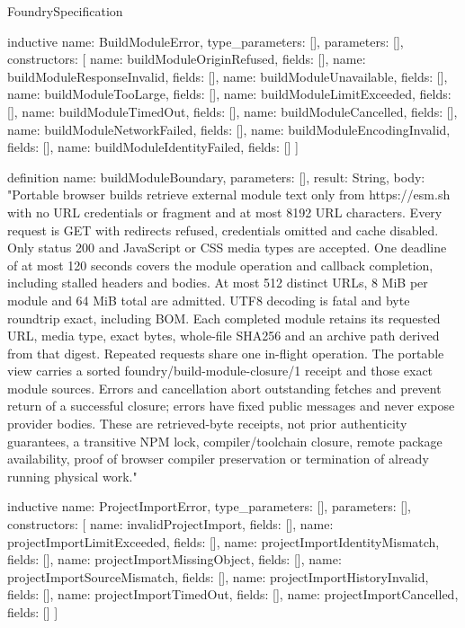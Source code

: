 \begin{lexlean}{FoundrySpecification}
\begin{semanticmodule}
inductive{
  name: BuildModuleError,
  type_parameters: [],
  parameters: [],
  constructors: [
    {name: buildModuleOriginRefused, fields: []},
    {name: buildModuleResponseInvalid, fields: []},
    {name: buildModuleUnavailable, fields: []},
    {name: buildModuleTooLarge, fields: []},
    {name: buildModuleLimitExceeded, fields: []},
    {name: buildModuleTimedOut, fields: []},
    {name: buildModuleCancelled, fields: []},
    {name: buildModuleNetworkFailed, fields: []},
    {name: buildModuleEncodingInvalid, fields: []},
    {name: buildModuleIdentityFailed, fields: []}
  ]
}

definition{
  name: buildModuleBoundary,
  parameters: [],
  result: String,
  body: "Portable browser builds retrieve external module text only from https://esm.sh with no URL credentials or fragment and at most 8192 URL characters. Every request is GET with redirects refused, credentials omitted and cache disabled. Only status 200 and JavaScript or CSS media types are accepted. One deadline of at most 120 seconds covers the module operation and callback completion, including stalled headers and bodies. At most 512 distinct URLs, 8 MiB per module and 64 MiB total are admitted. UTF8 decoding is fatal and byte roundtrip exact, including BOM. Each completed module retains its requested URL, media type, exact bytes, whole-file SHA256 and an archive path derived from that digest. Repeated requests share one in-flight operation. The portable view carries a sorted foundry/build-module-closure/1 receipt and those exact module sources. Errors and cancellation abort outstanding fetches and prevent return of a successful closure; errors have fixed public messages and never expose provider bodies. These are retrieved-byte receipts, not prior authenticity guarantees, a transitive NPM lock, compiler/toolchain closure, remote package availability, proof of browser compiler preservation or termination of already running physical work."
}

inductive{
  name: ProjectImportError,
  type_parameters: [],
  parameters: [],
  constructors: [
    {name: invalidProjectImport, fields: []},
    {name: projectImportLimitExceeded, fields: []},
    {name: projectImportIdentityMismatch, fields: []},
    {name: projectImportMissingObject, fields: []},
    {name: projectImportSourceMismatch, fields: []},
    {name: projectImportHistoryInvalid, fields: []},
    {name: projectImportTimedOut, fields: []},
    {name: projectImportCancelled, fields: []}
  ]
}


\end{semanticmodule}
\end{lexlean}
